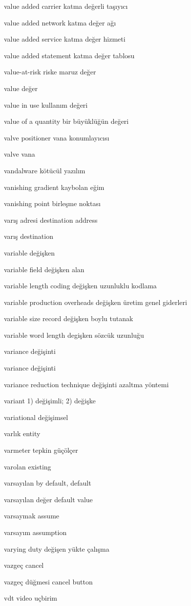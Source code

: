 \documentclass[12pt,fleqn]{article}\usepackage{../../common}
\begin{document}
value added carrier katma değerli taşıyıcı

value added network katma değer ağı

value added service katma değer hizmeti

value added statement katma değer tablosu

value-at-risk riske maruz değer

value değer

value in use kullanım değeri

value of a quantity bir büyüklüğün değeri

valve positioner vana konumlayıcısı

valve vana

vandalware kötücül yazılım

vanishing gradient kaybolan eğim

vanishing point birleşme noktası

varış adresi destination address

varış destination

variable değişken

variable field değişken alan

variable length coding değişken uzunluklu kodlama

variable production overheads değişken üretim genel giderleri

variable size record değişken boylu tutanak

variable word length degişken sözcük uzunluğu

variance değişinti

variance değişinti

variance reduction technique değişinti azaltma yöntemi

variant 1) değişimli; 2) değişke

variational değişimsel

varlık entity

varmeter tepkin güçölçer

varolan existing

varsayılan by default, default

varsayılan değer default value

varsaymak assume

varsayım assumption

varying duty değişen yükte çalışma

vazgeç cancel

vazgeç düğmesi cancel button

vdt video uçbirim
\end{document}
